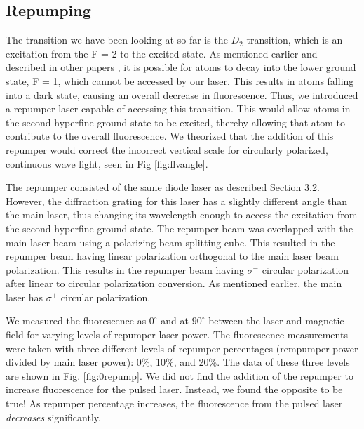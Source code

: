 \subsection{Repumping}
The transition we have been looking at so far is the $D_{2}$ transition, which is an excitation from the F = 2 to the excited state. As mentioned earlier and described in other papers \cite{Kane2014}, it is possible for atoms to decay into the lower ground state, F = 1, which cannot be accessed by our laser. This results in atoms falling into a dark state, causing an overall decrease in fluorescence. Thus, we introduced a repumper laser capable of accessing this transition. This would allow atoms in the second hyperfine ground state to be excited, thereby allowing that atom to contribute to the overall fluorescence. We theorized that the addition of this repumper would correct the incorrect vertical scale for circularly polarized, continuous wave light, seen in Fig \ref{fig:flvangle}. 

The repumper consisted of the same diode laser as described Section 3.2. However, the diffraction grating for this laser has a slightly different angle than the main laser, thus changing its wavelength enough to access the excitation from the second hyperfine ground state. The repumper beam was overlapped with the main laser beam using a polarizing beam splitting cube. This resulted in the repumper beam having linear polarization orthogonal to the main laser beam polarization. This results in the repumper beam having $\sigma^{-}$ circular polarization after linear to circular polarization conversion. As mentioned earlier, the main laser has $\sigma^{+}$ circular polarization.

We measured the fluorescence as $0^{\circ}$ and at $90^{\circ}$ between the laser and magnetic field for varying levels of repumper laser power. The fluorescence measurements were taken with three different levels of repumper percentages (rempumper power divided by main laser power): 0\%, 10\%, and 20\%. The data of these three levels are shown in Fig. \ref{fig:0repump}. We did not find the addition of the repumper to increase fluorescence for the pulsed laser. Instead, we found the opposite to be true! As repumper percentage increases, the fluorescence from the pulsed laser \textit{decreases} significantly.

